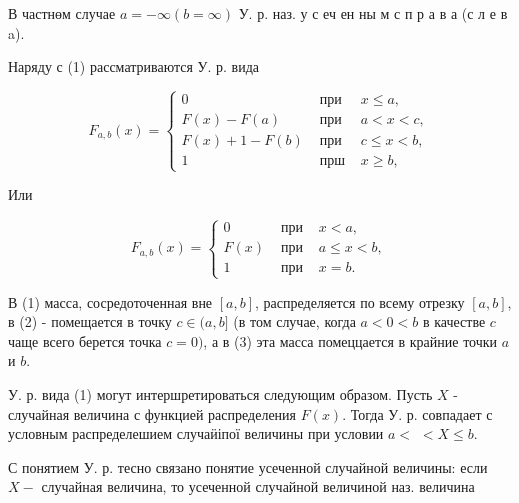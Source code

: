 \documentclass[10pt]{article}
\begin{document}
В частнөм случае $a=-\infty(b=\infty)$ У. р. наз. у с еч ен ны м с п р а в а (с л е в a).



Наряду с (1) рассматриваются У. р. вида



\[

F_{a, b}(x)=\left\{\begin{array}{cll}

0 & \text { при } & x \leqslant a, \\

F(x)-F(a) & \text { при } & a<x<c, \\

F(x)+1-F(b) & \text { при } & c \leqslant x<b, \\

1 & \text { прш } & x \geqslant b,

\end{array}\right.

\]



Или



\[

F_{a, b}(x)=\left\{\begin{array}{ccl}

0 & \text { при } & x<a, \\

F(x) & \text { при } & a \leqslant x<b, \\

1 & \text { при } & x=b .

\end{array}\right.

\]



В (1) масса, сосредоточенная вне $[a, b]$, распределяется по всему отрезку $[a, b]$, в (2) - помещается в точку $c \in(a, b]$ (в том случае, когда $a<0<b$ в качестве $c$ чаще всего берется точка $c=0)$, а в (3) эта масса помеццается в крайние точки $a$ и $b$.



У. р. вида (1) могут интершретироваться следующим образом. Пусть $X$ - случайная величина с функцией распределения $F(x)$. Тогда У. р. совпадает с условным распределешием случаӥіпої величины при условии $a<$ $<X \leqslant b$.



С понятием У. р. тесно связано понятие усеченной случайной величины: если $X-$ случайная величина, то усеченной случайной величиной наз. величина
\end{document}
